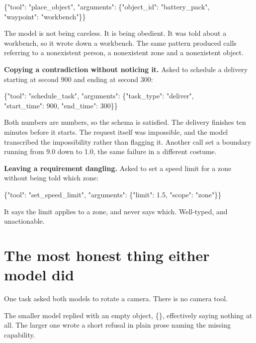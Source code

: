 \documentclass[11pt,a4paper]{article}
\newcommand{\code}[1]{{\ttfamily\small #1}}
\begin{document}
\begin{quotebox}
\code{\{"tool": "place\_object", "arguments": \{"object\_id": "battery\_pack",}\\
\code{\hspace*{9.4em}"waypoint": "workbench"\}\}}
\end{quotebox}

The model is not being careless. It is being obedient. It was told about a workbench, so it wrote down a workbench. The same pattern produced calls referring to a nonexistent person, a nonexistent zone and a nonexistent object.

\textbf{Copying a contradiction without noticing it.} Asked to schedule a delivery starting at second 900 and ending at second 300:

\begin{quotebox}
\code{\{"tool": "schedule\_task", "arguments": \{"task\_type": "deliver",}\\
\code{\hspace*{9.4em}"start\_time": 900, "end\_time": 300\}\}}
\end{quotebox}

Both numbers are numbers, so the schema is satisfied. The delivery finishes ten minutes before it starts. The request itself was impossible, and the model transcribed the impossibility rather than flagging it. Another call set a boundary running from 9.0 down to 1.0, the same failure in a different costume.

\textbf{Leaving a requirement dangling.} Asked to set a speed limit for a zone without being told which zone:

\begin{quotebox}
\code{\{"tool": "set\_speed\_limit", "arguments": \{"limit": 1.5, "scope": "zone"\}\}}
\end{quotebox}

It says the limit applies to a zone, and never says which. Well-typed, and unactionable.

\section{The most honest thing either model did}

One task asked both models to rotate a camera. There is no camera tool.

The smaller model replied with an empty object, \code{\{\}}, effectively saying nothing at all. The larger one wrote a short refusal in plain prose naming the missing capability.
\end{document}
